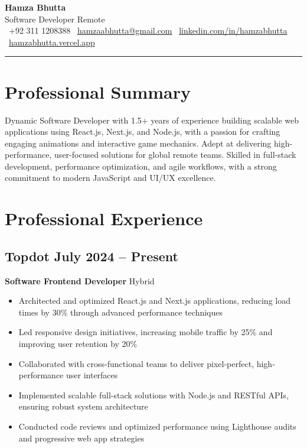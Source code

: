 \documentclass[11pt]{article}
\makeatletter
\newcommand{\resumeHeader}[4]{
    \begin{center}
        \vspace*{10pt}
        {\Huge\bfseries\color{headercolor} #1} \\[8pt]
        {\large\color{headercolor} Software Developer \textbullet{} #2} \\[6pt]
        {\normalsize\color{headercolor}
            \faPhone~#3  {}
            \faEnvelope~\href{mailto:hamzaabhutta@gmail.com}{hamzaabhutta@gmail.com}  {}
            \faLinkedin~\href{https://www.linkedin.com/in/hamzabhutta}{linkedin.com/in/hamzabhutta} {}
            \faGlobe~\href{https://hamzabhutta.vercel.app/}{hamzabhutta.vercel.app}
        }
        \vspace{15pt}
        \hrule height 1pt
        \vspace{10pt}
    \end{center}
}
\makeatother
\begin{document}
\pagestyle{empty} %
\RaggedRight %

\resumeHeader{Hamza Bhutta}{Remote}{+92 311 1208388}{}

\section{Professional Summary}\justifying
Dynamic Software Developer with 1.5+ years of experience building scalable web applications using React.js, Next.js, and Node.js, with a passion for crafting engaging animations and interactive game mechanics. Adept at delivering high-performance, user-focused solutions for global remote teams. Skilled in full-stack development, performance optimization, and agile workflows, with a strong commitment to modern JavaScript and UI/UX excellence.

\section{Professional Experience}
\subsection{\texorpdfstring{Topdot \hfill July 2024 -- Present}{Topdot, July 2024 -- Present}}
\textbf{Software Frontend Developer} \hfill Hybrid
\begin{itemize}
\item Architected and optimized React.js and Next.js applications, reducing load times by 30\% through advanced performance techniques
\item Led responsive design initiatives, increasing mobile traffic by 25\% and improving user retention by 20\%
\item Collaborated with cross-functional teams to deliver pixel-perfect, high-performance user interfaces
\item Implemented scalable full-stack solutions with Node.js and RESTful APIs, ensuring robust system architecture
\item Conducted code reviews and optimized performance using Lighthouse audits and progressive web app strategies
\end{itemize}
\end{document}

